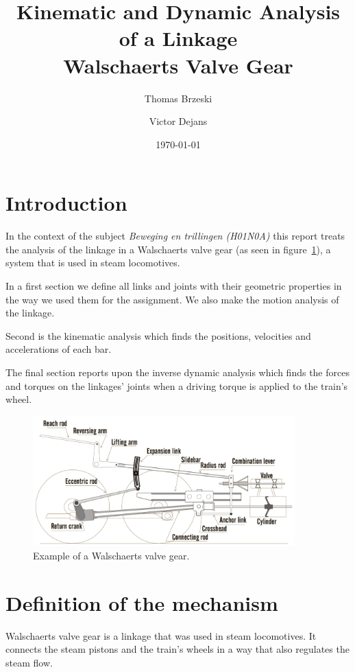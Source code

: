 \documentclass[a4paper]{article}
\date{\today}
\author{Thomas Brzeski \and  Victor Dejans}
\title{Kinematic and Dynamic Analysis of a Linkage\\ Walschaerts Valve Gear}
\begin{document}
\maketitle

\section*{Introduction}

In the context of the subject \textit{Beweging en trillingen (H01N0A)} this report treats the analysis of the linkage in a Walschaerts valve gear (as seen in figure~\ref{fig:basistekening}), a system that is used in steam locomotives.

In a first section we define all links and joints with their geometric properties in the way we used them for the assignment. We also make the motion analysis of the linkage.

Second is the kinematic analysis which finds the positions, velocities and accelerations of each bar.

The final section reports upon the inverse dynamic analysis which finds the forces and torques on the linkages' joints when a driving torque is applied to the train's wheel.



\begin{figure}[h]
	\includegraphics[width=0.9\textwidth]{wvgverslag.png}
	\centering
	\caption{Example of a Walschaerts valve gear. \cite{ove06}}
	\label{fig:basistekening}
\end{figure}

\newpage
\tableofcontents

\section{Definition of the mechanism}

Walschaerts valve gear is a linkage that was used in steam locomotives. It connects the steam pistons and the train's wheels in a way that also regulates the steam flow.
\end{document}
